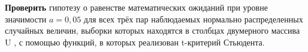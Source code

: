 \textbf{Проверить} гипотезу о равенстве математических ожиданий при уровне
значимости $a = 0,05$ для всех трёх пар наблюдаемых нормально
распределенных случайных величин, выборки которых находятся в столбцах
двумерного массива U , с помощью функций, в которых реализован t-критерий
Стьюдента.


